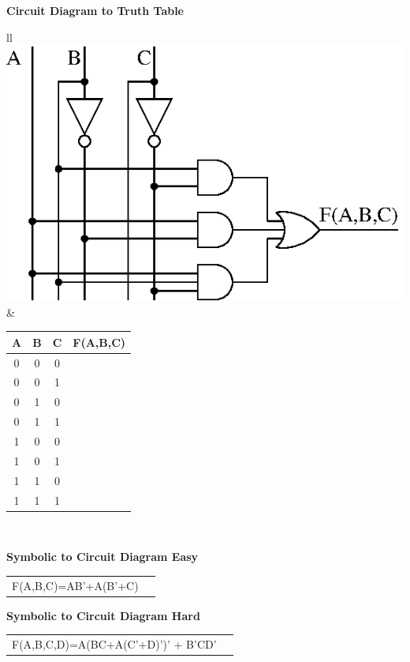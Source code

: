 {\bf Circuit Diagram to Truth Table}

\begin{tabular}{ll}
	\includegraphics{./Fig2/cd-tt}
&
	\begin{tabular}{c|c|c||c}
	A & B & C & F(A,B,C) \\ \hline \hline
	0 & 0 & 0 &   \\ \hline
	0 & 0 & 1 &   \\ \hline
	0 & 1 & 0 &   \\ \hline
	0 & 1 & 1 &   \\ \hline
	1 & 0 & 0 &   \\ \hline
	1 & 0 & 1 &   \\ \hline
	1 & 1 & 0 &   \\ \hline
	1 & 1 & 1 &   \\
	\end{tabular}	\\
\end{tabular}




{\bf Symbolic to Circuit Diagram Easy}
\begin{tabular}{lp{2in}}
F(A,B,C)=AB'+A(B'+C)  & \\
\end{tabular}
\vspace{0.5in}

{\bf Symbolic to Circuit Diagram Hard}
\begin{tabular}{lp{2in}}
F(A,B,C,D)=A(BC+A(C'+D)')' + B'CD'  & \\
\end{tabular}
\vspace{0.5in}

